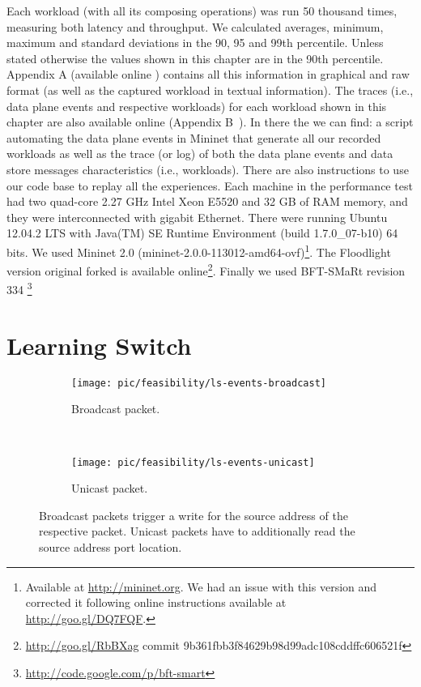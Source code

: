 Each workload (with all its composing operations)  was run 50 thousand times, measuring both latency and throughput. 
We calculated averages, minimum, maximum and standard deviations in the 90, 95 and 99th percentile. 
Unless stated otherwise the values shown in this chapter are in the 90th percentile. Appendix A (available online \cite{support})  contains all this information in graphical and raw format (as well as the captured workload in textual information). The traces (i.e., data plane events and respective workloads) for each workload shown in this chapter are also available online (Appendix B~\cite{support}). 
In there the we can find: a script automating the data plane events in Mininet that generate all our recorded workloads as well as the trace (or log)  of both the data plane events and data store messages characteristics (i.e.,  workloads). 
There are also instructions to use our code base to replay all the experiences. 
Each machine in the performance test had two quad-core 2.27 GHz Intel Xeon E5520 and 32 GB of RAM memory, and they were interconnected with gigabit Ethernet. 
There were running  Ubuntu 12.04.2 LTS with  Java(TM) SE Runtime Environment (build 1.7.0\_07-b10) 64 bits.
 We used Mininet 2.0 (mininet-2.0.0-113012-amd64-ovf)\footnote{Available at \url{http://mininet.org}. We had an issue with this version and corrected it following online instructions available at \url{http://goo.gl/DQ7FQF}.}. 
The Floodlight version original forked  is available online\footnote{\url{http://goo.gl/RbBXag} commit 9b361fbb3f84629b98d99adc108cddffc606521f}. Finally we used BFT-SMaRt revision 334 \footnote{\url{http://code.google.com/p/bft-smart}} 


\section{Learning Switch} 
\label{sec:feasibility:ls}
\glsresetall

\begin{figure}[ht]
  \begin{subfigure}[b]{0.5\textwidth}
                \centering
                \texttt{[image: pic/feasibility/ls-events-broadcast]}
                \caption{Broadcast packet.}
                \label{fig:ls:interaction:broadcast}
        \end{subfigure}%
        ~
        \begin{subfigure}[b]{0.5\textwidth}
                \centering
                \texttt{[image: pic/feasibility/ls-events-unicast]}
                \caption{Unicast packet.}
                \label{fig:ls:interaction:unicast}
        \end{subfigure}
        \caption[Learning Switch workloads]{Broadcast packets trigger a write for the source address of the respective packet. Unicast packets have to additionally read the source address port location.}
        \label{fig:ls:interaction}
\end{figure}


